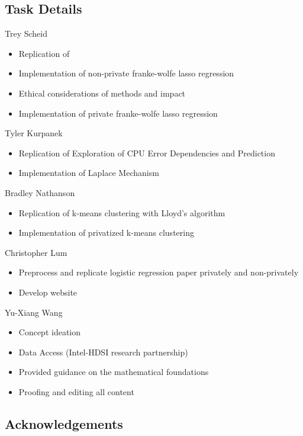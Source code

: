\documentclass[12pt,letterpaper]{article}
\begin{document}
\subsection{Task Details}

Trey Scheid
\begin{itemize}
    \item Replication of \cite{lassocarbon}
    \item Implementation of non-private franke-wolfe lasso regression
    \item Ethical considerations of methods and impact
    \item Implementation of private franke-wolfe lasso regression
\end{itemize}

Tyler Kurpanek
\begin{itemize}
    \item Replication of Exploration of CPU Error Dependencies and Prediction \cite{Kwasnick2023}
    \item Implementation of Laplace Mechanism 
\end{itemize}

Bradley Nathanson
\begin{itemize}
    \item Replication of k-means clustering with Lloyd's algorithm \cite{kmeans}
    \item Implementation of privatized k-means clustering
\end{itemize}

Christopher Lum
\begin{itemize}
  \item Preprocess and replicate logistic regression paper privately and non-privately \cite{prodhealLR}
  \item Develop website
\end{itemize}

Yu-Xiang Wang
\begin{itemize}
  \item Concept ideation
  \item Data Access (Intel-HDSI research partnership)
  \item Provided guidance on the mathematical foundations
  \item Proofing and editing all content
\end{itemize}


\subsection{Acknowledgements}
\end{document}
